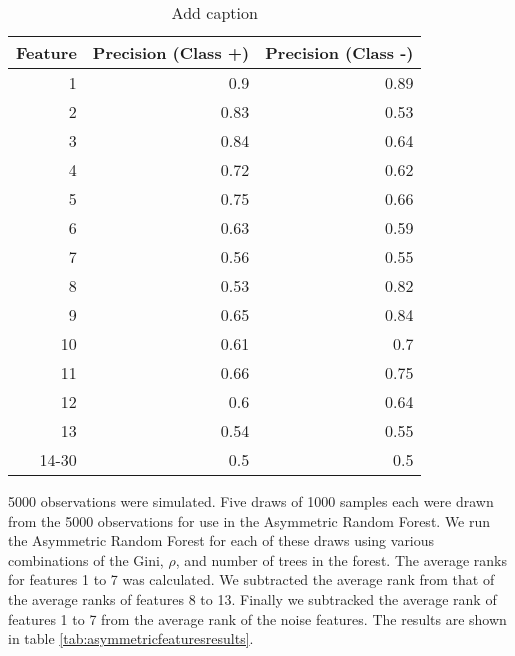 \documentclass[twoside,11pt]{article}
\begin{document}
\begin{table}[htbp]
  \centering
  \caption{Add caption}
    \begin{tabular}{rrr}
    \hline
    Feature & Precision (Class +) & Precision (Class -) \bigstrut\\
    \hline
    1     & 0.9   & 0.89 \bigstrut[t]\\
    2     & 0.83  & 0.53 \\
    3     & 0.84  & 0.64 \\
    4     & 0.72  & 0.62 \\
    5     & 0.75  & 0.66 \\
    6     & 0.63  & 0.59 \\
    7     & 0.56  & 0.55 \\
    8     & 0.53  & 0.82 \\
    9     & 0.65  & 0.84 \\
    10    & 0.61  & 0.7 \\
    11    & 0.66  & 0.75 \\
    12    & 0.6   & 0.64 \\
    13    & 0.54  & 0.55 \\
    14-30 & 0.5   & 0.5 \bigstrut[b]\\
    \hline
    \end{tabular}%
  \label{tab:asymmetricfeatures1}%
\end{table}%

5000 observations were simulated. Five draws of 1000 samples each were drawn from the 5000 observations for use in the Asymmetric Random Forest. We run the Asymmetric Random Forest for each of these draws using various combinations of the Gini, $\rho$, and number of trees in the forest. The average ranks for features 1 to 7 was calculated. We subtracted the average rank from that of the average ranks of features 8 to 13. Finally we subtracked the average rank of features 1 to 7 from the average rank of the noise features. The results are shown in table \ref{tab:asymmetricfeaturesresults}.


\end{document}
